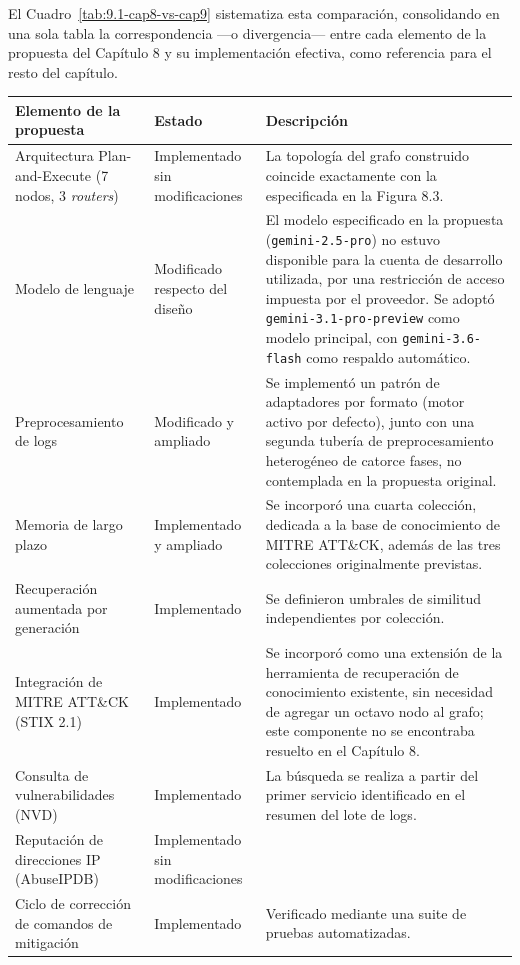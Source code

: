 El Cuadro~\ref{tab:9.1-cap8-vs-cap9} sistematiza esta comparación,
consolidando en una sola tabla la correspondencia —o divergencia— entre
cada elemento de la propuesta del Capítulo 8 y su implementación efectiva,
como referencia para el resto del capítulo.

\begin{table}[H]
\centering
\small
\begin{tabular}{p{3.3cm}p{3cm}p{7cm}}
\toprule
\textbf{Elemento de la propuesta} & \textbf{Estado} & \textbf{Descripción} \\
\midrule
Arquitectura Plan-and-Execute (7 nodos, 3 \textit{routers}) & Implementado sin modificaciones & La topología del grafo construido coincide exactamente con la especificada en la Figura 8.3. \\
Modelo de lenguaje & Modificado respecto del diseño & El modelo especificado en la propuesta (\texttt{gemini-2.5-pro}) no estuvo disponible para la cuenta de desarrollo utilizada, por una restricción de acceso impuesta por el proveedor. Se adoptó \texttt{gemini-3.1-pro-preview} como modelo principal, con \texttt{gemini-3.6-flash} como respaldo automático. \\
Preprocesamiento de logs & Modificado y ampliado & Se implementó un patrón de adaptadores por formato (motor activo por defecto), junto con una segunda tubería de preprocesamiento heterogéneo de catorce fases, no contemplada en la propuesta original. \\
Memoria de largo plazo & Implementado y ampliado & Se incorporó una cuarta colección, dedicada a la base de conocimiento de MITRE ATT\&CK, además de las tres colecciones originalmente previstas. \\
Recuperación aumentada por generación & Implementado & Se definieron umbrales de similitud independientes por colección. \\
Integración de MITRE ATT\&CK (STIX 2.1) & Implementado & Se incorporó como una extensión de la herramienta de recuperación de conocimiento existente, sin necesidad de agregar un octavo nodo al grafo; este componente no se encontraba resuelto en el Capítulo 8. \\
Consulta de vulnerabilidades (NVD) & Implementado & La búsqueda se realiza a partir del primer servicio identificado en el resumen del lote de logs. \\
Reputación de direcciones IP (AbuseIPDB) & Implementado sin modificaciones & \\
Ciclo de corrección de comandos de mitigación & Implementado & Verificado mediante una suite de pruebas automatizadas. \\

\end{tabular}
\end{table}

